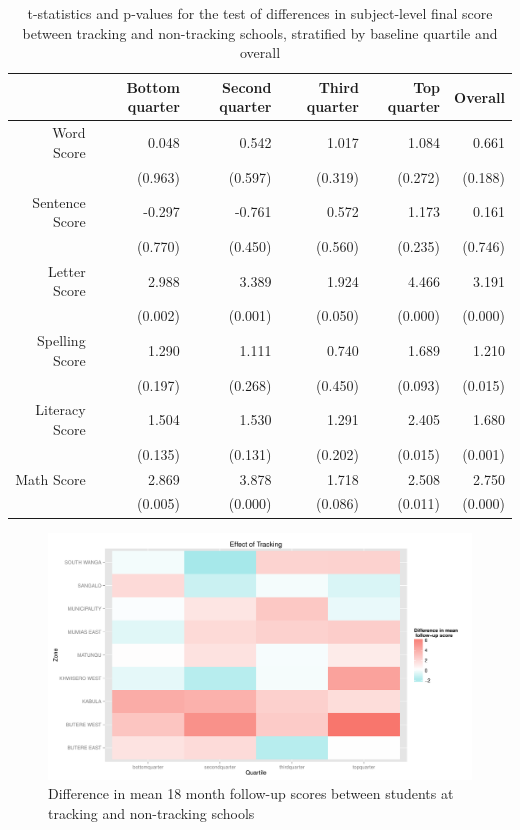 \documentclass[11pt]{article}
\begin{document}
\begin{table}[ht]
\centering
\begin{tabular}{rrrrrr}
  \hline
 & Bottom quarter & Second quarter & Third quarter & Top quarter & Overall \\ 
  \hline
Word Score & 0.048 & 0.542 & 1.017 & 1.084 & 0.661 \\ 
   & (0.963) & (0.597) & (0.319) & (0.272) & (0.188) \\ 
  Sentence Score & -0.297 & -0.761 & 0.572 & 1.173 & 0.161 \\ 
   & (0.770) & (0.450) & (0.560) & (0.235) & (0.746) \\ 
  Letter Score & 2.988 & 3.389 & 1.924 & 4.466 & 3.191 \\ 
   & (0.002) & (0.001) & (0.050) & (0.000) & (0.000) \\ 
  Spelling Score & 1.290 & 1.111 & 0.740 & 1.689 & 1.210 \\ 
   & (0.197) & (0.268) & (0.450) & (0.093) & (0.015) \\ 
  Literacy Score & 1.504 & 1.530 & 1.291 & 2.405 & 1.680 \\ 
   & (0.135) & (0.131) & (0.202) & (0.015) & (0.001) \\ 
  Math Score & 2.869 & 3.878 & 1.718 & 2.508 & 2.750 \\ 
   & (0.005) & (0.000) & (0.086) & (0.011) & (0.000) \\ 
   \hline
\end{tabular}
\caption{t-statistics and p-values for the test of differences in subject-level final score between tracking and non-tracking schools, stratified by baseline quartile and overall} \label{tab:stratif-topics}
\end{table} %



 \begin{figure}[H]
 \centering
 \includegraphics[scale=0.5]{tracking_by_zone.pdf}
 \caption{Difference in mean 18 month follow-up scores between students at tracking and non-tracking schools}
 \label{fig:stratif-zone}
 \end{figure}
 
\end{document}
